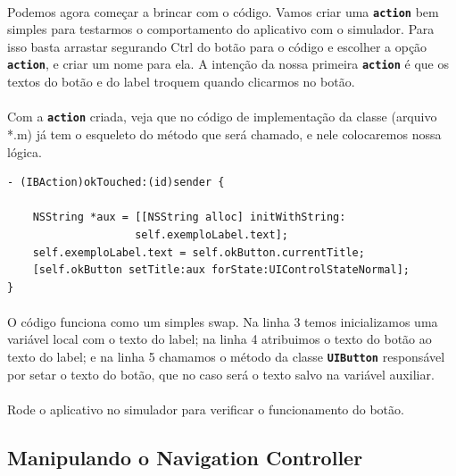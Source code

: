 \documentclass[a4paper,12pt,brazil,doubleside]{book}
\begin{document}
\bigskip

\paragraph{}Podemos agora começar a brincar com o código. Vamos criar uma \texttt{\textbf{action}} bem simples para testarmos o comportamento do aplicativo com o simulador. Para isso basta arrastar segurando Ctrl do botão para o código e escolher a opção \texttt{\textbf{action}}, e criar um nome para ela. A intenção da nossa primeira \texttt{\textbf{action}} é que os textos do botão e do label troquem quando clicarmos no botão.
\paragraph{}Com a \texttt{\textbf{action}} criada, veja que no código de implementação da classe (arquivo *.m) já tem o esqueleto do método que será chamado, e nele colocaremos nossa lógica.

\begin{listing}
\begin{verbatim}
- (IBAction)okTouched:(id)sender {
    
    NSString *aux = [[NSString alloc] initWithString:
                    self.exemploLabel.text];
    self.exemploLabel.text = self.okButton.currentTitle;
    [self.okButton setTitle:aux forState:UIControlStateNormal];
}
\end{verbatim}
\end{listing}

\paragraph{}O código funciona como um simples swap. Na linha 3 temos inicializamos uma variável local com o texto do label; na linha 4 atribuimos o texto do botão ao texto do label; e na linha 5 chamamos o método da classe \texttt{\textbf{UIButton}} responsável por setar o texto do botão, que no caso será o texto salvo na variável auxiliar.
\paragraph{}Rode o aplicativo no simulador para verificar o funcionamento do botão.\\

\bigskip

\subsection{Manipulando o Navigation Controller}
\end{document}
